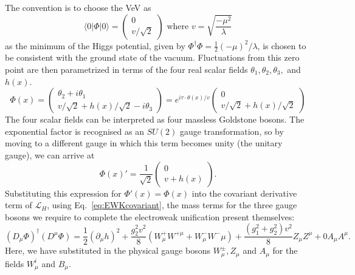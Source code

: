The convention is to choose the \ac{VeV} as 
\begin{equation}
\langle 0 | \Phi | 0 \rangle = \left(  
\begin{array}{c}
0 \\
v/\sqrt{2}
\end{array} \right)
\text{ where }
v = \sqrt{\frac{- \mu^{2}}{\lambda}}
\end{equation}
as the minimum of the Higgs potential, given by $\Phi^{\dag} \Phi = \frac{1}{2} (- \mu)^{2}/\lambda$, 
 is chosen to be consistent with the ground state of the vacuum.
Fluctuations from this zero point are then parametrized in terms of the four real scalar fields $\theta_{1} , \theta_{2} ,\theta_{3},$ and $h(x)$.
%
\begin{equation}
\Phi(x) = \left(  
\begin{array}{c}
\theta_{2} + i \theta_{1} \\
v/ \sqrt{2} + h(x)/ \sqrt{2} - i \theta_{3}
\end{array} \right)
= e^{i \tau \cdot \theta(x)/v}
 \left(  
 \begin{array}{c}
 0 \\
 v/\sqrt{2} + h(x)/\sqrt{2} 
 \end{array} 
 \right)
\end{equation}
%
The four scalar fields can be interpreted as four massless Goldstone bosons.
The exponential factor is recognised as an $SU(2)$ gauge transformation, so by moving to a different gauge in which this term becomes unity (the unitary gauge), we can arrive at
\begin{equation}
\Phi(x)' = \frac{1}{\sqrt{2}}
 \left(  
 \begin{array}{c}
 0 \\
 v + h(x) 
 \end{array} 
 \right).
 \label{eq:unitaryGauge}
\end{equation}
Substituting this expression for $\Phi'(x) = \Phi(x)$ into the covariant derivative term of $\mathcal{L}_{H}$, using Eq.~\ref{eq:EWKcovariant}, 
the mass terms for the three gauge bosons we require to complete the electroweak unification present themselves:
\begin{equation}
(D_{\mu}\Phi)^{\dag}(D^{\mu}\Phi) = \frac{1}{2}(\partial_{\mu}h)^{2} + \frac{g_{2}^{2}v^{2}}{8}\left( W^{+}_{\mu}W^{+\mu} + W^{-}_{\mu}W^-{\mu} \right)+ \frac{(g_{1}^{2}+g_{2}^{2})v^{2}}{8}Z_{\mu}Z^{\mu} + 0 A_{\mu}A^{\mu}.
\label{eq:covariantWithHiggsMech}
\end{equation}
Here, we have substituted in the physical gauge bosons $W^{\pm}_{\mu}, Z_{\mu}$ and $A_{\mu}$ for the fields $W^{i}_{\mu}$ and $B_{\mu}$.
